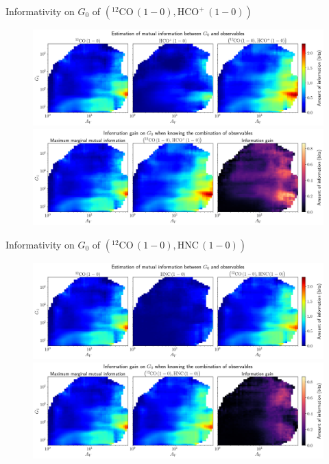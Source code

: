 \documentclass{beamer}
\begin{document}
\begin{frame}{Informativity on $G_0$ of $\left(\mathrm{^{12}CO\,(1-0)},\mathrm{HCO^+\,(1-0)}\right)$}
    \begin{figure}
        \centering
        \includegraphics[width=0.95\linewidth]{../mi/g0__12co10_hcop10_mi.png}
        \vfill
        \includegraphics[width=0.95\linewidth]{../mi/g0__12co10_hcop10_mi_gain.png}
    \end{figure}
\end{frame}

\begin{frame}{Informativity on $G_0$ of $\left(\mathrm{^{12}CO\,(1-0)},\mathrm{HNC\,(1-0)}\right)$}
    \begin{figure}
        \centering
        \includegraphics[width=0.95\linewidth]{../mi/g0__12co10_hnc10_mi.png}
        \vfill
        \includegraphics[width=0.95\linewidth]{../mi/g0__12co10_hnc10_mi_gain.png}
    \end{figure}
\end{frame}
\end{document}
